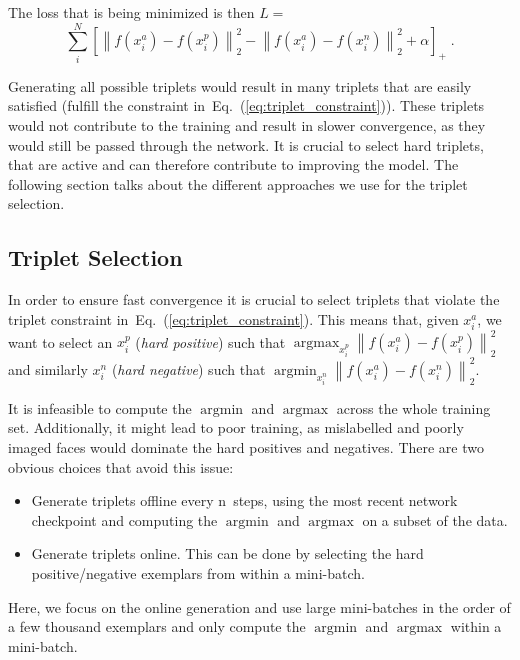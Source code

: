\documentclass[10pt,twocolumn,letterpaper]{article}
\DeclareMathOperator{\argmax}{argmax}
\DeclareMathOperator{\argmin}{argmin}
\begin{document}
The loss that is being minimized is then $L=$
\begin{equation}\label{eq:triplet_loss}
  \sum_i^N\left[\left\|f(x_i^a)-f(x_i^p)\right\|_2^2 -
                  \left\|f(x_i^a)-f(x_i^n)\right\|_2^2+\alpha\right]_+\;.
\end{equation}

Generating all possible triplets would result in many triplets that are easily
satisfied (\ie fulfill the constraint in~Eq.~(\ref{eq:triplet_constraint})).
These triplets would not contribute to the training and result in slower
convergence, as they would still be passed through the network. It is crucial
to select hard triplets, that are active and can therefore contribute to
improving the model. The following section talks about the different approaches
we use for the triplet selection.

\subsection{Triplet Selection} \label{TripletSelection}

In order to ensure fast convergence it is crucial to select triplets that
violate the triplet constraint in~Eq.~(\ref{eq:triplet_constraint}).  This means
that, given $x_i^a$, we want to select an $x_i^p$ (\emph{hard positive}) such
that $\argmax_{x_i^p}\left\|f(x_i^a)-f(x_i^p)\right\|_2^2$ and similarly
$x_i^n$ (\emph{hard negative}) such that $\argmin_{x_i^n}\left\|f(x_i^a)-f(x_i^n)\right\|_2^2$.

It is infeasible to compute the $\argmin$ and $\argmax$ across the whole
training set. Additionally, it might lead to poor training, as mislabelled and
poorly imaged faces would dominate the hard positives and negatives.
There are two obvious choices that avoid this issue:
\begin{itemize}
    \item Generate triplets offline every n~steps, using the most recent
      network checkpoint and computing the $\argmin$ and $\argmax$ on a subset
      of the data.
    \item Generate triplets online.  This can be done by selecting the hard
      positive/negative exemplars from within a mini-batch.
\end{itemize}

Here, we focus on the online generation and use large mini-batches in the order
of a few thousand exemplars and only compute the $\argmin$ and $\argmax$ within
a mini-batch.
\end{document}
